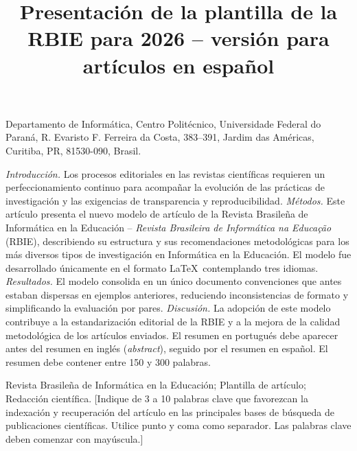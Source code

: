 \documentclass[spanish]{rbie2026}%
\title[Título corto del artículo en español]{Presentación de la plantilla de la RBIE para 2026 -- versión para artículos en español}
\author[
    Direne 20XX (1 autor) | Direne \& Tarouco 20XX (2 autores) | Direne et al. 20XX (3 o más autores)]{
    
        \affil{\textbf{Alexandre Ibrahim Direne} \thinspace \orcidlink{0000-0000-0000-0000} \thinspace \textcolor{blue}{\faEnvelopeO} \enspace [{Universidade Federal do Paraná} \thinspace | \thinspace \href{mailto:alexd@inf.ufpr.br}{{\textit{alexd@inf.ufpr.br}}}]}
    
        \affil{\textbf{José Armando Valente} \thinspace \orcidlink{0000-0002-1347-186X} \enspace [{Universidade Estadual de Campinas} \thinspace | \thinspace \href{mailto:jvalente@unicamp.br}{{\textit{jvalente@unicamp.br}}}]}
    
        \affil{\textbf{Liane Margarida Rockenbach Tarouco} \thinspace \orcidlink{0000-0002-5669-588X} \enspace [{Universidade Federal do Rio Grande do Sul} \thinspace | \thinspace \href{mailto:liane@penta.ufrgs.br}{{\textit{liane@penta.ufrgs.br}}}]}
}
\begin{document}

\begin{frontmatter}
    \maketitle

    \begin{mail}
        Departamento de Informática, Centro Politécnico, Universidade Federal do Paraná, R. Evaristo F. Ferreira da Costa, 383--391, Jardim das Américas, Curitiba, PR, 81530-090, Brasil.
    \end{mail}


    \begin{abstract-es}
        \textit{Introducción.} Los procesos editoriales en las revistas científicas requieren un perfeccionamiento continuo para acompañar la evolución de las prácticas de investigación y las exigencias de transparencia y reproducibilidad. \textit{Métodos.} Este artículo presenta el nuevo modelo de artículo de la Revista Brasileña de Informática en la Educación -- \emph{Revista Brasileira de Informática na Educação} (RBIE), describiendo su estructura y sus recomendaciones metodológicas para los más diversos tipos de investigación en Informática en la Educación. El modelo fue desarrollado únicamente en el formato \LaTeX\, contemplando tres idiomas. \textit{Resultados.} El modelo consolida en un único documento convenciones que antes estaban dispersas en ejemplos anteriores, reduciendo inconsistencias de formato y simplificando la evaluación por pares. \textit{Discusión.} La adopción de este modelo contribuye a la estandarización editorial de la RBIE y a la mejora de la calidad metodológica de los artículos enviados. El resumen en portugués debe aparecer antes del resumen en inglés (\emph{abstract}), seguido por el resumen en español. El resumen debe contener entre 150 y 300 palabras.
    \end{abstract-es}

    \begin{pclaves}
        Revista Brasileña de Informática en la Educación; Plantilla de artículo; Redacción científica. [Indique de 3 a 10 palabras clave que favorezcan la indexación y recuperación del artículo en las principales bases de búsqueda de publicaciones científicas. Utilice punto y coma como separador. Las palabras clave deben comenzar con mayúscula.]
    \end{pclaves}


\end{frontmatter}
\end{document}
